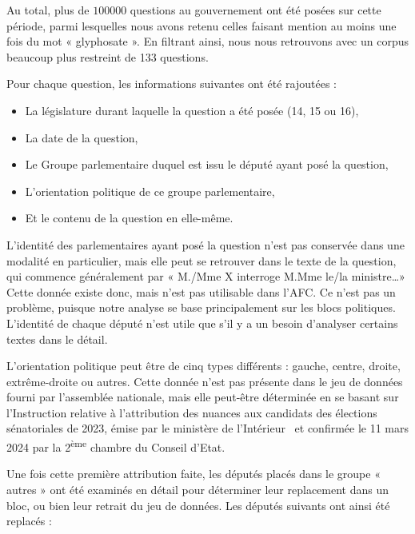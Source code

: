 \documentclass[12pt,twocolumn,landscape]{article}
\begin{document}
    Au total, plus de $100 000$ questions au gouvernement ont
    été posées sur cette période, parmi lesquelles nous avons
    retenu celles faisant mention au moins une fois
    du mot « glyphosate ».
    En filtrant ainsi, nous nous retrouvons avec un corpus
    beaucoup plus restreint de 133 questions.

    Pour chaque question, les informations suivantes ont été rajoutées :

    \begin{itemize}
        \item La législature durant laquelle la question a été posée (14, 15 ou 16),
        \item La date de la question,
        \item Le Groupe parlementaire duquel est issu le député ayant posé la question,
        \item L'orientation politique de ce groupe parlementaire,
        \item Et le contenu de la question en elle-même.
    \end{itemize}

    L'identité des parlementaires ayant posé la question n'est pas conservée
    dans une modalité en particulier, mais elle peut se retrouver
    dans le texte de la question, qui commence généralement par
    « M./Mme X interroge M.Mme le/la ministre\ldots »
    Cette donnée existe donc, mais n'est pas utilisable dans l'AFC\@.
    Ce n'est pas un problème, puisque notre analyse se base principalement
    sur les blocs politiques.
    L'identité de chaque député n'est utile que s'il y a un besoin
    d'analyser certains textes dans le détail.

    L'orientation politique peut être de cinq types différents :
    gauche, centre, droite, extrême-droite ou autres.
    Cette donnée n'est pas présente dans le jeu de données
    fourni par l'assemblée nationale, mais elle peut-être déterminée
    en se basant sur l'Instruction relative à l'attribution
    des nuances aux candidats des élections sénatoriales de 2023,
    émise par le ministère de l'Intérieur~\cite{nuances-politiques}
    et confirmée le 11 mars 2024 par la 2\textsuperscript{ème} chambre
    du Conseil d'Etat\cite{nuances-politiques-ce}.

    Une fois cette première attribution faite, les députés
    placés dans le groupe « autres » ont été examinés en détail
    pour déterminer leur replacement dans un bloc, ou bien leur retrait
    du jeu de données.
    Les députés suivants ont ainsi été replacés :
\end{document}
